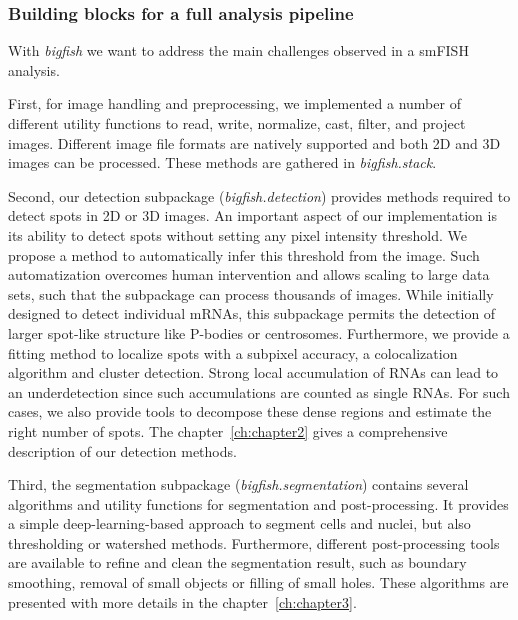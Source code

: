 \subsubsection{Building blocks for a full analysis pipeline}

With \emph{bigfish} we want to address the main challenges observed in a \ac{smFISH} analysis.

First, for image handling and preprocessing, we implemented a number of different utility functions to read, write, normalize, cast, filter, and project images.
Different image file formats are natively supported and both 2D and 3D images can be processed.
These methods are gathered in \emph{bigfish.stack}.

Second, our detection subpackage (\emph{bigfish.detection}) provides methods required to detect spots in 2D or 3D images.
An important aspect of our implementation is its ability to detect spots without setting any pixel intensity threshold.
We propose a method to automatically infer this threshold from the image.
Such automatization overcomes human intervention and allows scaling to large data sets, such that the subpackage can process thousands of images.
While initially designed to detect individual \ac{mRNA}s, this subpackage permits the detection of larger spot-like structure like P-bodies or centrosomes.
Furthermore, we provide a fitting method to localize spots with a subpixel accuracy, a colocalization algorithm and cluster detection.
Strong local accumulation of \ac{RNA}s can lead to an underdetection since such accumulations are counted as single \ac{RNA}s.
For such cases, we also provide tools to decompose these dense regions and estimate the right number of spots.
The chapter~\ref{ch:chapter2} gives a comprehensive description of our detection methods.

Third, the segmentation subpackage (\emph{bigfish.segmentation}) contains several algorithms and utility functions for segmentation and post-processing.
It provides a simple deep-learning-based approach to segment cells and nuclei, but also thresholding or watershed methods.
Furthermore, different post-processing tools are available to refine and clean the segmentation result, such as boundary smoothing, removal of small objects or filling of small holes.
These algorithms are presented with more details in the chapter~\ref{ch:chapter3}.

